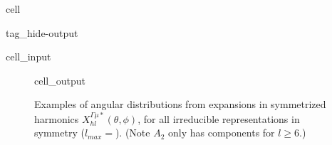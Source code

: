 \documentclass[letterpaper,table,10pt,english]{jupyterBook}
\begin{document}
\begin{sphinxuseclass}{cell}
\begin{sphinxuseclass}{tag_hide-output}
\begin{sphinxVerbatimInput}
\begin{sphinxuseclass}{cell_input}
\begin{sphinxVerbatim}[commandchars=\\\{\}]
   \PYG{p}{[}\PYG{p}{]}        
  \PYG{p}{[}\PYG{p}{]}\PYG{p}{[}\PYG{p}{]}\PYG{p}{[}\PYG{p}{]}\PYG{p}{[}\PYG{p}{]}\PYG{p}{[}\PYG{p}{]}

 
\end{sphinxVerbatim}

\end{sphinxuseclass}\end{sphinxVerbatimInput}

\end{sphinxuseclass}
\end{sphinxuseclass}
\begin{figure}[htbp]
\centering
\capstart
\begin{sphinxVerbatimOutput}

\begin{sphinxuseclass}{cell_output}
\noindent{}

\end{sphinxuseclass}\end{sphinxVerbatimOutput}
\caption{Examples of angular distributions from expansions in symmetrized harmonics \(X_{hl}^{\Gamma\mu*}(\theta,\phi)\), for all irreducible representations in  symmetry (\(l_{max}=\)). (Note \(A_2\) only has components for \(l\geq 6\).)}\label{\detokenize{part1/theory_observables_intro_211122:fig-symharmpads-example}}
\begin{sphinxlegend}\end{sphinxlegend}
\end{figure}
\end{document}
